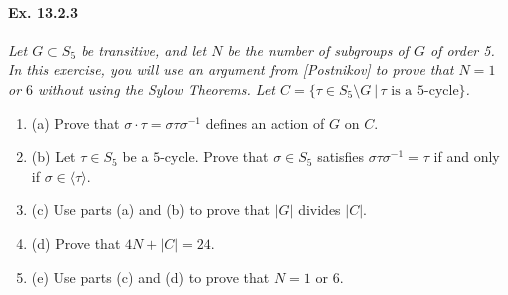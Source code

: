 \documentclass[11pt,a4paper]{article}
\newcommand{\be} {\begin{enumerate}}
\newcommand{\ee} {\end{enumerate}}
\begin{document}
\paragraph{Ex. 13.2.3}

{\it Let $G \subset S_5$ be transitive, and let $N$ be the number of subgroups of $G$ of order 5. In this exercise, you will use an argument from [Postnikov] to prove that $N=1$ or $6$ without using the Sylow Theorems. Let $C = \{\tau \in S_5 \setminus G\ |\, \tau \text{ is a 5-cycle}\}$.
\be
\item[(a)] Prove that $\sigma \cdot \tau = \sigma \tau \sigma^{-1}$ defines an action of $G$ on $C$.
\item[(b)] Let $\tau \in S_5$ be a $5$-cycle. Prove that $\sigma \in S_5$ satisfies $\sigma \tau \sigma^{-1} = \tau$ if and only if $\sigma \in \langle \tau \rangle$.
\item[(c)] Use parts (a) and (b) to prove that $|G|$ divides $|C|$.
\item[(d)] Prove that $4N + |C| = 24$.
\item[(e)] Use parts (c) and (d) to prove that $N=1$ or $6$.
\ee
}
\end{document}
